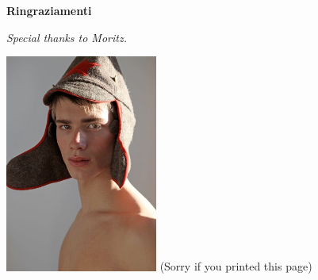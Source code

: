 \thispagestyle{empty}

\begin{center}
  {\bf \Huge Ringraziamenti}
\end{center}

\vspace{4cm}


\emph{
  Special thanks to Moritz.
}

 \includegraphics[width=50mm,scale=0.5]{moritz-mitterbauer.jpg}
	(Sorry if you printed this page)
